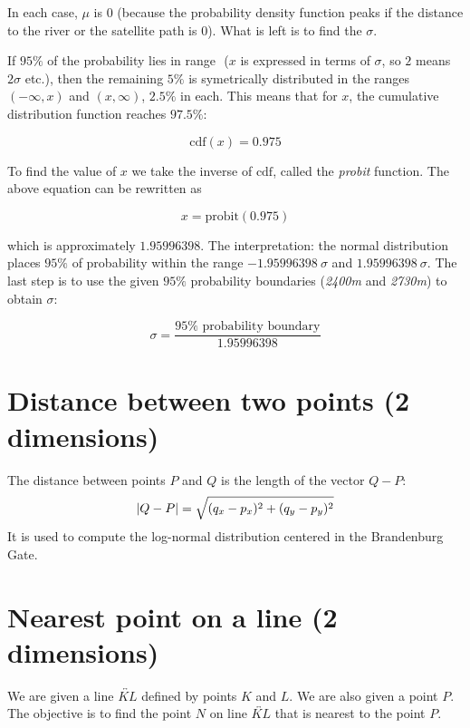 \documentclass[a4paper,12pt]{article}
\begin{document}
In each case, \(\mu\) is \(0\) (because the probability density function peaks if the distance
to the river or the satellite path is \(0\)). What is left is to find the \(\sigma\).

If \(95\%\) of the probability lies in range \(<-x, x>\) (\(x\) is expressed in terms of \(\sigma\), so \(2\) means \(2\sigma\) etc.),
then the remaining \(5\%\) is symetrically distributed in the ranges \((-\infty, x)\) and \((x, \infty)\), \(2.5\%\) in each.
This means that for \(x\), the cumulative distribution function reaches \(97.5\%\):

\[\mbox{cdf}(x) = 0.975\]

To find the value of \(x\) we take the inverse of \(\mbox{cdf}\), called the \emph{probit} function. The above equation can
be rewritten as

\[x = \mbox{probit}(0.975)\]

which is approximately \(1.95996398\). The interpretation: the normal distribution places \(95\%\) of probability
within the range \(-1.95996398\: \sigma\) and \(1.95996398\: \sigma\).
The last step is to use the given \(95\%\) probability boundaries (\emph{2400m} and \emph{2730m})
to obtain \(\sigma\):

\[\sigma = \frac{\mbox{\(95\%\) probability boundary}}{1.95996398}\]

\section{Distance between two points (2 dimensions)}

The distance between points \(P\) and \(Q\) is the length of the vector \(Q - P\):
\[\abs{Q - P} = \sqrt{(q_x - p_x)^2 + (q_y - p_y)^2}\]
It is used to compute the log-normal distribution centered in the Brandenburg Gate.


\section{Nearest point on a line (2 dimensions)}

We are given a line \(\overleftrightarrow{KL}\) defined by points \(K\) and \(L\).
We are also given a point \(P\).
The objective is to find the point \(N\) on line \(\overleftrightarrow{KL}\)
that is nearest to the point \(P\).
\end{document}

